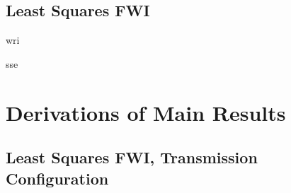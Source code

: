 \subsection{Least Squares FWI}


wri

sse







\section{Derivations of Main Results}






\subsection{Least Squares FWI, Transmission Configuration}


